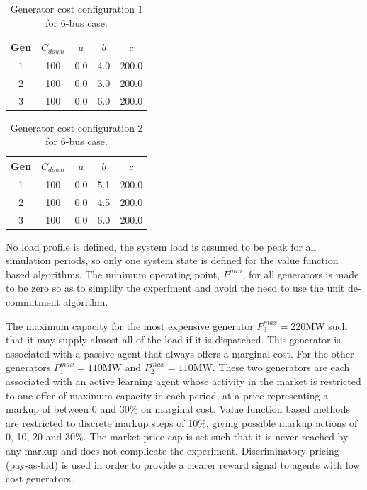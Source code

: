 
\begin{table}
\begin{center}
\begin{tabular}{c|c|c|c|c}
\hline
Gen &$C_{down}$ &$a$ &$b$ &$c$ \\
\hline\hline
 1 &100 &0.0 &4.0 &200.0 \\
 2 &100 &0.0 &3.0 &200.0 \\
 3 &100 &0.0 &6.0 &200.0 \\
\hline
\end{tabular}
\caption{Generator cost configuration 1 for 6-bus case.}
\label{tbl:case6ww_gencost1}
\end{center}
\end{table}

\begin{table}
\begin{center}
\begin{tabular}{c|c|c|c|c}
\hline
Gen &$C_{down}$ &$a$ &$b$ &$c$ \\
\hline\hline
 1 &100 &0.0 &5.1 &200.0 \\
 2 &100 &0.0 &4.5 &200.0 \\
 3 &100 &0.0 &6.0 &200.0 \\
\hline
\end{tabular}
\caption{Generator cost configuration 2 for 6-bus case.}
\label{tbl:case6ww_gencost2}
\end{center}
\end{table}

No load profile is defined, the system load is assumed to be peak for all
simulation periods, so only one system state is defined for the value function
based algorithms.  The minimum operating point, $P^{min}$, for all generators
is made to be zero so as to simplify the experiment and avoid the need to
use the unit de-commitment algorithm.

The maximum capacity for the most expensive generator $P^{max}_3=220$MW such
that it may supply almost all of the load if it is dispatched.  This
generator is associated with a passive agent that always offers a marginal
cost.  For the other generators $P^{max}_1=110$MW and $P^{max}_2=110$MW.  These
two generators are each associated with an active learning agent whose activity
in the market is restricted to one offer of maximum capacity in each period,
at a price representing a markup of between 0 and 30\% on marginal cost.
Value function based methods are restricted to discrete markup steps of 10\%,
giving possible markup actions of 0, 10, 20 and 30\%. The market price cap is
set such that it is never reached by any markup and does not complicate the
experiment.  Discriminatory pricing (pay-as-bid) is used in order to provide a
clearer reward signal to agents with low cost generators.

